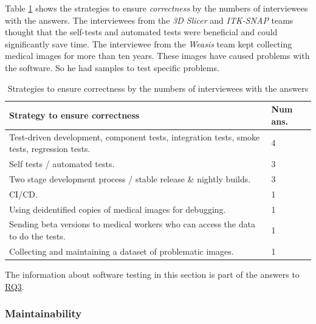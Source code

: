 \documentclass[final, 3p, times, authoryear]{elsarticle}
\begin{document}
Table \ref{tab_q15_strategies_correctness} shows the strategies to ensure
\textit{correctness} by the numbers of interviewees with the answers. The
interviewees from the \textit{3D Slicer} and \textit{ITK-SNAP} teams thought
that the self-tests and automated tests were beneficial and could significantly
save time. The interviewee from the \textit{Weasis} team kept collecting medical
images for more than ten years. These images have caused problems with the
software. So he had samples to test specific problems.

\begin{table}[ht]
\centering
\hspace*{-1.5cm}\begin{tabular}{ll}
\hline
Strategy to ensure correctness & Num ans. \\ \hline
Test-driven development, component tests, integration tests, smoke tests, regression tests. & 4 \\
Self tests / automated tests. & 3 \\
Two stage development process / stable release \& nightly builds. & 3 \\
CI/CD. & 1 \\
Using deidentified copies of medical images for debugging. & 1 \\
Sending beta versions to medical workers who can access the data to do the tests. & 1 \\
Collecting and maintaining a dataset of problematic images. & 1 \\ \hline
\end{tabular}
\caption{\label{tab_q15_strategies_correctness}Strategies to ensure correctness
by the numbers of interviewees with the answers}
\end{table}

The information about software testing in this section is part of the answers to
\hyperlink{rq3}{RQ3}.

\subsubsection{Maintainability} \label{sec_interview_maintainability}

\end{document}
